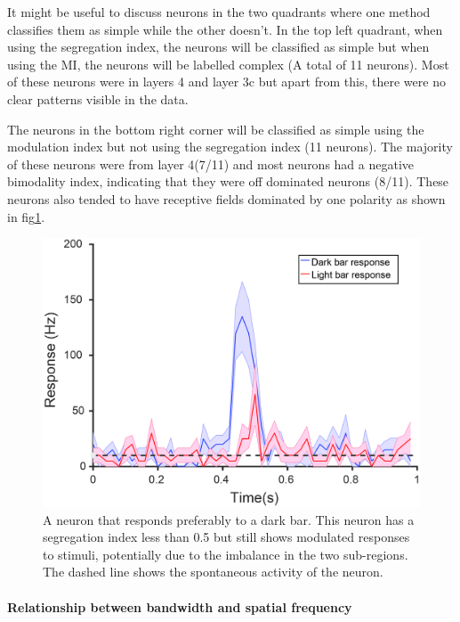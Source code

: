 	It might be useful to discuss neurons in the two quadrants where one method classifies them as simple while the other doesn't. In the top left quadrant, when using the segregation index, the neurons will be classified as simple but when using the MI, the neurons will be labelled complex (A total of 11 neurons). Most of these neurons were in layers 4 and layer 3c but apart from this, there were no clear patterns visible in the data.
	
	The neurons in the bottom right corner will be classified as simple using the modulation index but not using the segregation index (11 neurons). The majority of these neurons were from layer 4(7/11) and most neurons had a negative bimodality index, indicating that they were off dominated neurons (8/11). These neurons also tended to have receptive fields dominated by one polarity as shown in fig\ref{fig:conc}.
	
		\begin{figure}[H]
		
		\includegraphics[width=\linewidth]{LinearV1/concneurons.jpg}
		\caption{A neuron that responds preferably to a dark bar. This neuron has a segregation index less than 0.5 but still shows modulated responses to stimuli, potentially due to the imbalance in the two sub-regions. The dashed line shows the spontaneous activity of the neuron.}
		\label{fig:conc}
	\end{figure}

	\paragraph{Relationship between bandwidth and spatial frequency}
	
